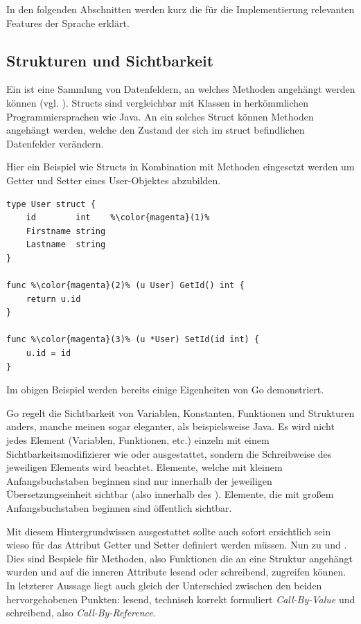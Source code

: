 \noindent
In den folgenden Abschnitten werden kurz die für die Implementierung relevanten Features der Sprache erklärt.
\subsection{Strukturen und Sichtbarkeit}
Ein  ist eine Sammlung von Datenfeldern, an welches Methoden angehängt werden können (vgl. \cite{go:spec:structs}). Structs sind vergleichbar mit Klassen in herkömmlichen Programmiersprachen wie Java. An ein solches Struct können Methoden angehängt werden, welche den Zustand der sich im struct befindlichen Datenfelder verändern.\bigskip

\noindent
\newpage
Hier ein Beispiel wie Structs in Kombination mit Methoden eingesetzt werden um Getter und Setter eines User-Objektes abzubilden. 
{\ColorfulCodeDisclaimer}
\begin{lstlisting}[style=goMono,caption={Struct in Kombination mit Methoden}]
type User struct {
    id        int    %\color{magenta}(1)%     
    Firstname string  
    Lastname  string 
}

func %\color{magenta}(2)% (u User) GetId() int {
    return u.id
}

func %\color{magenta}(3)% (u *User) SetId(id int) {
    u.id = id
}
\end{lstlisting}
Im obigen Beispiel werden bereits einige Eigenheiten von Go demonstriert.\bigskip

\noindent
Go regelt die Sichtbarkeit von Variablen, Konstanten, Funktionen und Strukturen anders, manche meinen sogar eleganter, als beispielsweise Java. Es wird nicht jedes Element (Variablen, Funktionen, etc.) einzeln mit einem Sichtbarkeitsmodifizierer wie  oder  ausgestattet, sondern die Schreibweise des jeweiligen Elements wird beachtet. Elemente, welche mit kleinem Anfangsbuchstaben beginnen sind nur innerhalb der jeweiligen Übersetzungseinheit sichtbar (also innerhalb des \frqq{}\flqq{}). Elemente, die mit großem Anfangsbuchstaben beginnen sind öffentlich sichtbar.\bigskip

\noindent
Mit diesem Hintergrundwissen ausgestattet sollte auch sofort ersichtlich sein wieso für das Attribut   Getter und Setter definiert werden müssen. Nun zu  und . Dies sind Bespiele für Methoden, also Funktionen die an eine Struktur angehängt wurden und auf die inneren Attribute lesend oder schreibend, zugreifen können. In letzterer Aussage liegt auch gleich der Unterschied zwischen den beiden hervorgehobenen Punkten: lesend, technisch korrekt formuliert \textit{Call-By-Value} und schreibend, also \textit{Call-By-Reference}.  

